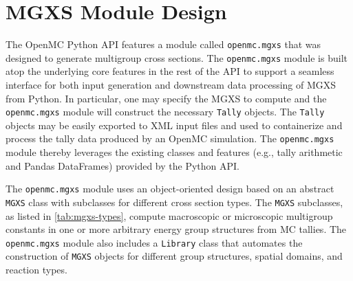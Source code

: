 \section{MGXS Module Design}
\label{sec:design}

The OpenMC Python API features a module called \texttt{openmc.mgxs} that was designed to generate multigroup cross sections. The \texttt{openmc.mgxs} module is built atop the underlying core features in the rest of the API to support a seamless interface for both input generation and downstream data processing of MGXS from Python. In particular, one may specify the MGXS to compute and the \texttt{openmc.mgxs} module will construct the necessary \texttt{Tally} objects. The \texttt{Tally} objects may be easily exported to XML input files and used to containerize and process the tally data produced by an OpenMC simulation. The \texttt{openmc.mgxs} module thereby leverages the existing classes and features (\textrm{e.g.}, tally arithmetic and Pandas DataFrames) provided by the Python API.

The \texttt{openmc.mgxs} module uses an object-oriented design based on an abstract \texttt{MGXS} class with subclasses for different cross section types. The \texttt{MGXS} subclasses, as listed in \cref{tab:mgxs-types}, compute macroscopic or microscopic multigroup constants in one or more arbitrary energy group structures from MC tallies. The \texttt{openmc.mgxs} module also includes a \texttt{Library} class that automates the construction of \texttt{MGXS} objects for different group structures, spatial domains, and reaction types.

